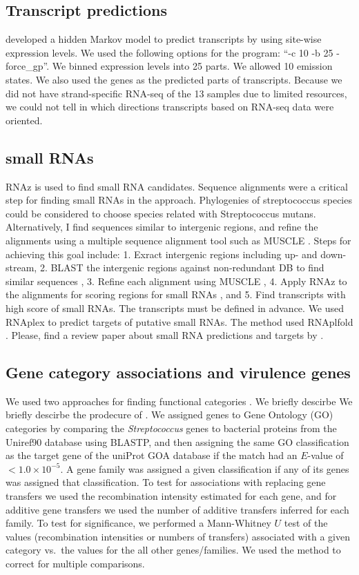 \documentclass{article}
\begin{document}
\subsection{Transcript predictions}
\citet{Martin2010} developed a hidden Markov model to predict transcripts by
using site-wise expression levels. We used the following options for the
program: ``-c 10 -b 25 -force\_gp''. We binned expression levels into 25 parts.
We allowed 10 emission states. We also used the genes as the predicted parts of
transcripts. 
Because we did not have strand-specific RNA-seq of the 13 samples due to
limited resources, we could not tell in which directions transcripts based on
RNA-seq data were oriented.

\subsection{small RNAs}
RNAz is used to find small RNA candidates. Sequence alignments were a critical
step for finding small RNAs in the approach. Phylogenies of streptococcus
species could be considered to choose species related with Streptococcus mutans.
Alternatively, I find sequences similar to intergenic regions, and refine the
alignments using a multiple sequence alignment tool such as MUSCLE
\cite{Edgar2004a}. Steps for achieving this goal include: 1. Exract intergenic
regions including up- and down-stream, 2. BLAST the intergenic regions against
non-redundant DB to find similar sequences \cite{Altschul1990}, 3. Refine each
alignment using MUSCLE \cite{Edgar2004a}, 4. Apply RNAz to the alignments for
scoring regions for small RNAs \cite{Washietl2005,Gruber2010}, and 5. Find
transcripts with high score of small RNAs. The transcripts must be defined in
advance.  We used RNAplex \citep{Tafer2008} to predict targets of putative small
RNAs. The method used RNAplfold \citep{Bernhart2006}.  Please, find a review
paper about small RNA predictions and targets by \citet{Tafer2008a}.

\subsection{Gene category associations and virulence genes}
We used two approaches for finding functional categories
\citep{Young2010,Suzuki2011}. We briefly descirbe We briefly descirbe the
prodecure of \citet{Suzuki2011}.  We assigned genes to Gene Ontology (GO)
categories by comparing the {\em Streptococcus} genes to bacterial proteins from
the Uniref90 database using BLASTP, and then assigning the same GO
classification as the target gene of the uniProt GOA database if the match had
an $E$-value of $<1.0\times10^{-5}.$  A gene family was assigned a given
classification if any of its genes was assigned that classification.  To test
for associations with replacing gene transfers we used the recombination
intensity estimated for each gene, and for additive gene transfers we used the
number of additive transfers inferred for each family.  To test for
significance, we performed a Mann-Whitney $U$ test of the values (recombination
intensities or numbers of transfers) associated with a given category vs.\ the
values for the all other genes/families.  We used the \cite{Benjamini1995}
method to correct for multiple comparisons.
\end{document}
